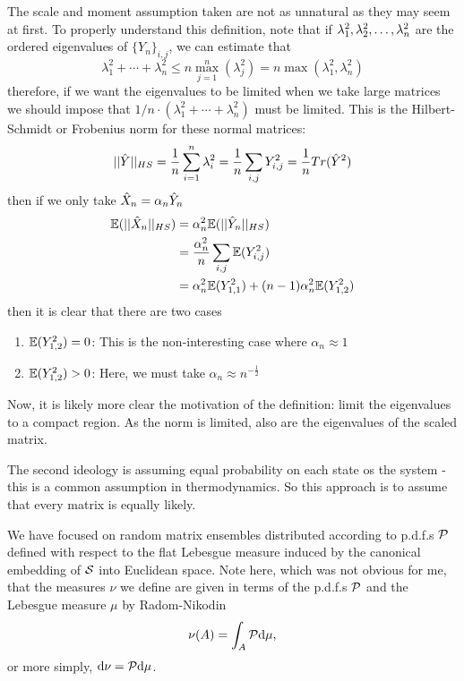 The scale and moment assumption taken are not as unnatural as they may seem at first. To properly understand this definition, note that if $\lambda^2_1, \lambda^2_2, \dots, \lambda^2_n$ are the ordered eigenvalues of $\{Y_n\}_{i,j}$, we can estimate that 
\begin{equation}
\lambda_1^2 + \cdots + \lambda_n^2 \leq n \max_{j=1}^{n}(\lambda_j^2) = n \max(\lambda_1^2, \lambda_n^2)
\end{equation}
therefore, if we want the eigenvalues to be limited when we take large matrices we should impose that $1/n \cdot (\lambda_1^2 + \cdots + \lambda_n^2)$ must be limited. This is the Hilbert-Schmidt or Frobenius norm for these normal matrices:
\begin{equation}
||\hat Y||_{HS} = \frac{1}{n} \sum_{i=1}^{n} \lambda_i^2 = \frac{1}{n} \sum_{i,j} Y_{i,j}^2 = \frac{1}{n} Tr(\hat Y^2)
\end{equation}
then if we only take $\hat X_n = \alpha_n \hat Y_n$
\begin{equation}
	\begin{split}
		\mathbb{E}(||\hat X_n||_{HS}) & = \alpha_n^2 \mathbb{E}(||\hat Y_n||_{HS}) \\
		& = \frac{\alpha_n^2}{n} \sum_{i,j} \mathbb{E}({Y_{i,j}^2}) \\
		& = \alpha_n^2 \mathbb{E}(Y_{1,1}^2) + (n-1) \alpha_n^2 \mathbb{E}(Y_{1,2}^2)
	\end{split}
\end{equation}
then it is clear that there are two cases
\begin{enumerate}
	\item $\mathbb{E}(Y^2_{1,2}) = 0$: This is the non-interesting case where $\alpha_n \approx 1$ 
	\item $\mathbb{E}(Y^2_{1,2}) > 0$: Here, we must take $\alpha_n \approx n^{-\frac{1}{2}}$ 
\end{enumerate}
Now, it is likely more clear the motivation of the definition: limit the eigenvalues to a compact region. As the norm is limited, also are the eigenvalues of the scaled matrix.

The second ideology is assuming equal probability on each state os the system - this is a common assumption in thermodynamics.  So this approach is to assume that every matrix is equally likely. 

\begin{obs}
	We have focused on random matrix ensembles distributed according to p.d.f.s $\mathcal{P}$ defined with respect to the flat Lebesgue measure induced by the canonical embedding of $\mathcal{S}$ into Euclidean space. Note here, which was not obvious for me, that the measures $\nu$ we define are given in terms of the p.d.f.s $\mathcal{P}$ and the Lebesgue measure $\mu$ by Radom-Nikodin \begin{equation}\nu(A) = \int_{A} \mathcal{P} \mathrm{d} \mu,\end{equation} or more simply, $\mathrm{d} \nu = \mathcal{P} \mathrm{d} \mu$.
\end{obs}

